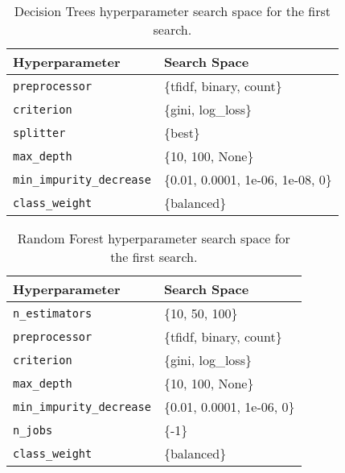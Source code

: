 \begin{table}[H]
\centering
\capstart
\begin{tabularx}{0.48\textwidth}{|l|X|}
\hline
Hyperparameter & Search Space \\
\hline
\texttt{preprocessor} & \{tfidf, binary, count\} \\
\texttt{criterion} & \{gini, log\_loss\} \\
\texttt{splitter} & \{best\} \\
\texttt{max\_depth} & \{10, 100, None\} \\
\texttt{min\_impurity\_decrease} & \{0.01, 0.0001, 1e-06, 1e-08, 0\} \\
\texttt{class\_weight} & \{balanced\} \\
\hline
\end{tabularx}
\caption{Decision Trees hyperparameter search space for the first search.}
\label{tab:hyperparameters_decision_tree_0}

\end{table}


\begin{table}[H]
\centering
\capstart
\begin{tabularx}{0.48\textwidth}{|l|X|}
\hline
Hyperparameter & Search Space \\
\hline
\texttt{n\_estimators} & \{10, 50, 100\} \\
\texttt{preprocessor} & \{tfidf, binary, count\} \\
\texttt{criterion} & \{gini, log\_loss\} \\
\texttt{max\_depth} & \{10, 100, None\} \\
\texttt{min\_impurity\_decrease} & \{0.01, 0.0001, 1e-06, 0\} \\
\texttt{n\_jobs} & \{-1\} \\
\texttt{class\_weight} & \{balanced\} \\
\hline
\end{tabularx}
\caption{Random Forest hyperparameter search space for the first search.}
\label{tab:hyperparameters_random_forest_0}

\end{table}


